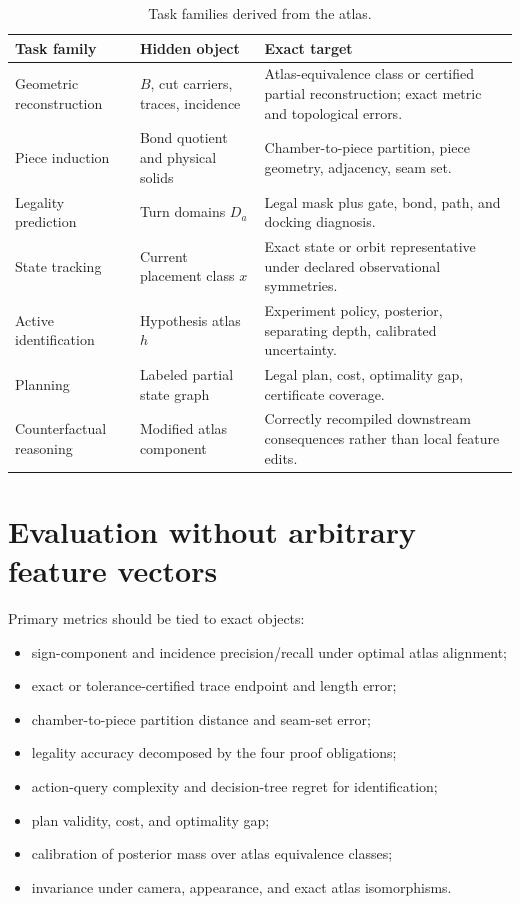 \documentclass[11pt,openany]{book}
\theoremstyle{polyplain}
\theoremstyle{polydef}
\begin{document}
\begin{table}[htbp]
\centering
\small
\begin{tabularx}{\textwidth}{L{0.19\textwidth}L{0.25\textwidth}Y}
\toprule
\textbf{Task family} & \textbf{Hidden object} & \textbf{Exact target}\\
\midrule
Geometric reconstruction & $B$, cut carriers, traces, incidence & Atlas-equivalence class or certified partial reconstruction; exact metric and topological errors.\\
Piece induction & Bond quotient and physical solids & Chamber-to-piece partition, piece geometry, adjacency, seam set.\\
Legality prediction & Turn domains $D_a$ & Legal mask plus gate, bond, path, and docking diagnosis.\\
State tracking & Current placement class $x$ & Exact state or orbit representative under declared observational symmetries.\\
Active identification & Hypothesis atlas $h$ & Experiment policy, posterior, separating depth, calibrated uncertainty.\\
Planning & Labeled partial state graph & Legal plan, cost, optimality gap, certificate coverage.\\
Counterfactual reasoning & Modified atlas component & Correctly recompiled downstream consequences rather than local feature edits.\\
\bottomrule
\end{tabularx}
\caption{Task families derived from the atlas.}
\label{tab:benchmark-spine}
\end{table}

\section{Evaluation without arbitrary feature vectors}

Primary metrics should be tied to exact objects:
\begin{itemize}
  \item sign-component and incidence precision/recall under optimal atlas alignment;
  \item exact or tolerance-certified trace endpoint and length error;
  \item chamber-to-piece partition distance and seam-set error;
  \item legality accuracy decomposed by the four proof obligations;
  \item action-query complexity and decision-tree regret for identification;
  \item plan validity, cost, and optimality gap;
  \item calibration of posterior mass over atlas equivalence classes;
  \item invariance under camera, appearance, and exact atlas isomorphisms.
\end{itemize}
\end{document}
